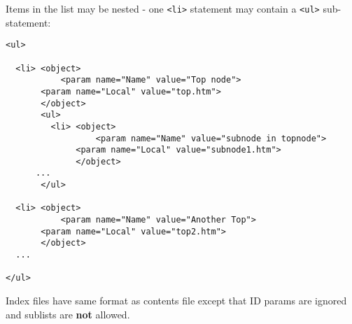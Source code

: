 Items in the list may be nested - one \verb$<li>$ statement may contain a \verb$<ul>$ sub-statement:

\begin{verbatim}
<ul>

  <li> <object>
           <param name="Name" value="Top node">
	   <param name="Local" value="top.htm">
       </object>
       <ul>
         <li> <object>
                  <param name="Name" value="subnode in topnode">
	          <param name="Local" value="subnode1.htm">
              </object>
	  ...
       </ul>
       
  <li> <object>
           <param name="Name" value="Another Top">
	   <param name="Local" value="top2.htm">
       </object>
  ...    

</ul>
\end{verbatim}


Index files have same format as contents file except that ID params are ignored and sublists are {\bf not} 
allowed.

